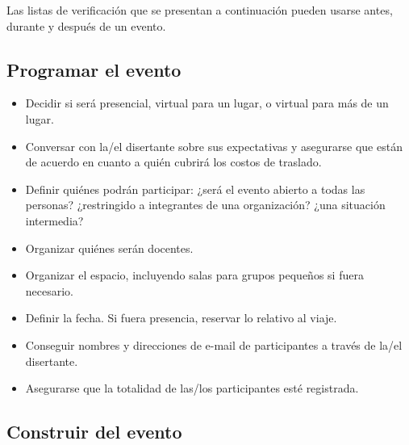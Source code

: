 
Las listas de verificación que se presentan a continuación pueden usarse antes, durante y después de un evento.

\subsection*{Programar el evento}

\begin{itemize}

\item
  Decidir si será presencial,
  virtual para un lugar,
  o virtual para más de un lugar.

\item
  Conversar con la/el disertante sobre sus expectativas
  y asegurarse que están de acuerdo en cuanto a quién cubrirá los costos de traslado.

\item
  Definir quiénes podrán participar:
  ¿será el evento abierto a todas las personas?
  ¿restringido a integrantes de una organización?
  ¿una situación intermedia?

\item
  Organizar quiénes serán docentes.

\item
  Organizar el espacio, incluyendo salas para grupos pequeños si fuera necesario.

\item
  Definir la fecha.
  Si fuera presencia, reservar lo relativo al viaje.

\item
  Conseguir nombres y direcciones de e-mail de participantes a través de la/el disertante.

\item
  Asegurarse que la totalidad de las/los participantes esté registrada.

\end{itemize}

\subsection*{Construir del evento}

